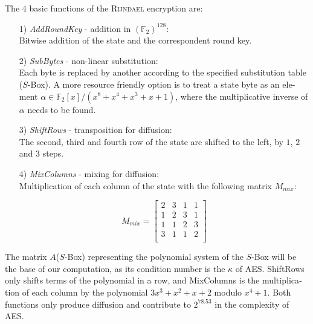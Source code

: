 \documentclass[a4paper,11pt]{article}
\begin{document}
\begin{otherlanguage}{english}
The $4$ basic functions of the \textsc{Rijndael} encryption are: \\

\begin{itemize} [noitemsep, nolistsep]
  \item[1)] \textit{AddRoundKey} - addition in ${(\mathbb{F}_2)}^{128}$: \\ 
  Bitwise addition of the state and the correspondent round key.
  \vspace{0.1cm}

  \item[2)] \textit{SubBytes} - non-linear substitution: \\
  Each byte is replaced by another according to the specified substitution table ($S$-Box). A more resource friendly option is to treat a state byte as an element $\alpha \in \mathbb{F}_2 [x]/(x^8 + x^4 + x^3 + x + 1)$, where the multiplicative inverse of $\alpha$ needs to be found.
  \vspace{0.1cm}

  \item[3)] \textit{ShiftRows} - transposition for diffusion: \\
  The second, third and fourth row of the state are shifted to the left, by $1$, $2$ and $3$ steps.
  \vspace{0.1cm}

  \item[4)] \textit{MixColumns} - mixing for diffusion: \\
  Multiplication of each column of the state with the following matrix $M_{mix}$:

  $$ 
  	M_{mix} = 
  	\begin{bmatrix}
  		2 & 3 & 1 & 1 \\ 
  	 	1 & 2 & 3 & 1 \\
  	 	1 & 1 & 2 & 3 \\
  	 	3 & 1 & 1 & 2 \\
  	\end{bmatrix}
  $$

\end{itemize} 

\vspace{0.3cm}
\noindent
The matrix $A$($S$-Box) representing the polynomial system of the $S$-Box will be the base of our computation, as its condition number is the $\kappa$ of  \textsc{AES}. ShiftRows only shifts terms of the polynomial in a row, and MixColumns is the multiplication of each column by the polynomial $3x^{3}+x^{2}+x+2$ modulo $x^4+1$. Both functions only produce diffusion and contribute to $2^{78.53}$ in the complexity of \textsc{AES}. \\


\end{otherlanguage}
\end{document}
